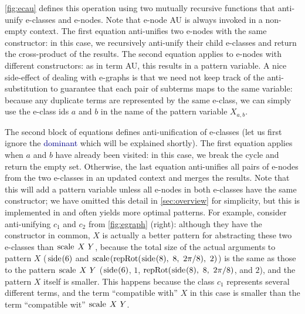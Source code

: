\autoref{fig:ecau} defines this operation using two mutually recursive functions
that anti-unify e-classes and e-nodes.
%
Note that e-node AU is always invoked in a non-empty context.
%
The first equation anti-unifies two e-nodes with the same constructor:
in this case, we recursively anti-unify their child e-classes
and return the cross-product of the results.
%
The second equation applies to e-nodes with different constructors:
as in term AU, this results in a pattern variable.
%
A nice side-effect of dealing with e-graphs
is that we need not keep track of the anti-substitution
to guarantee that each pair of subterms maps to the same variable:
because any duplicate terms are represented by the same e-class,
we can simply use the e-class ids $a$ and $b$ in the name of the pattern variable $X_{a,b}$.
%

The second block of equations defines anti-unification of e-classes
(let us first ignore the \textcolor{darkblue}{\sf dominant} which will be explained shortly).
%
The first equation applies when $a$ and $b$ have already been visited:
in this case, we break the cycle and return the empty set.
%
Otherwise, the last equation anti-unifies all pairs of e-nodes from the two e-classes
in an updated context and merges the results.
%
Note that this will add a pattern variable unless all e-nodes in both e-classes
have the same constructor;
we have omitted this detail in \autoref{sec:overview} for simplicity,
but this is implemented in \tool and often yields more optimal patterns.
%
For example, consider anti-unifying $c_1$ and $c_2$ from \autoref{fig:egraph} (right):
although they have the constructor  in common,
$X$ is actually a better pattern for abstracting these two e-classes than $\T{scale}\  X\ Y$,
because the total size of the actual arguments to pattern $X$ ($\pSide{6}$ and $\scale{\repRot{\pSide{8}}{8}{2\pi/8}}{2}$)
is the same as those to the pattern $\T{scale}\  X\ Y$ ($\pSide{6}$, $1$, $\repRot{\pSide{8}}{8}{2\pi/8}$, and $2$),
and the pattern $X$ itself is smaller.
%
This happens because the class $c_1$ represents several different terms, 
and the term ``compatible with'' $X$ in this case is smaller than the term ``compatible wit'' $\T{scale}\  X\ Y$.


